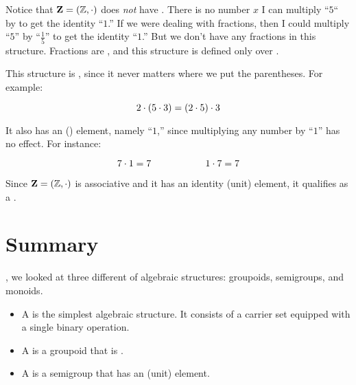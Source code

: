 \documentclass[../../../main.tex]{subfiles}
\begin{document}
\begin{example}
\begin{aside}
  \begin{remark}
    Notice that $\algebra{Z} = (\Ints/, \mult/)$ does \emph{not} have . There is no number $x$ I can multiply ``$5$`` by to get the identity ``$1$.'' If we were dealing with fractions, then I could multiply ``$5$'' by ``$\frac{1}{5}$'' to get the identity ``$1$.'' But we don't have any fractions in this structure. Fractions are , and this structure is defined only over . 
  \end{remark}
\end{aside}

This structure is , since it never matters where we put the parentheses. For example:

\begin{equation*}
  2 \mult/ (5 \mult/ 3) = (2 \mult/ 5) \mult/ 3
\end{equation*}

It also has an  () element, namely ``$1$,'' since multiplying any number by ``$1$'' has no effect. For instance:

\begin{equation*}
  7 \mult/ 1 = 7 \hskip 2cm 1 \mult/ 7 = 7
\end{equation*}

Since $\algebra{Z} = (\Ints/, \mult/)$ is associative and it has an identity (unit) element, it qualifies as a .

\end{example}


\section{Summary}

, we looked at three different  of algebraic structures: groupoids, semigroups, and monoids.

\begin{itemize}

  \item A  is the simplest algebraic structure. It consists of a carrier set equipped with a single binary operation.
  
  \item A  is a groupoid that is .
  
  \item A  is a semigroup that has an  (unit) element.

\end{itemize}
\end{document}
